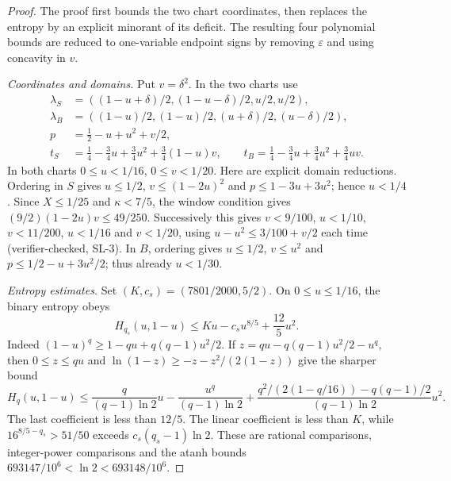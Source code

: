 \begin{proof}
The proof first bounds the two chart coordinates, then replaces the entropy by an explicit
minorant of its deficit. The resulting four polynomial bounds are reduced to one-variable
endpoint signs by removing $\varepsilon$ and using concavity in $v$.

\emph{Coordinates and domains.}
Put $v=\delta^2$. In the two charts use
\[
\begin{aligned}
\lambda_S&=((1-u+\delta)/2,(1-u-\delta)/2,u/2,u/2),\\
\lambda_B&=((1-u)/2,(1-u)/2,(u+\delta)/2,(u-\delta)/2),\\
p&=\tfrac12-u+u^2+v/2,\\
t_S&=\tfrac14-\tfrac34u+\tfrac34u^2+\tfrac34(1-u)v,\qquad
t_B=\tfrac14-\tfrac34u+\tfrac34u^2+\tfrac34uv.
\end{aligned}
\tag{SV}\label{eq:fqe-sliver-coordinates}
\]
In both charts $0\le u<1/16$, $0\le v<1/20$.
Here are explicit domain reductions. Ordering in $S$ gives $u\le1/2$,
$v\le(1-2u)^2$ and $p\le1-3u+3u^2$; hence $u<1/4$.
Since $X\le1/25$ and $\kappa<7/5$, the window condition gives
$(9/2)(1-2u)v\le49/250$.
Successively this gives $v<9/100$, $u<1/10$, $v<11/200$,
$u<1/16$ and $v<1/20$, using $u-u^2\le3/100+v/2$ each time
(verifier-checked, SL-3).
In $B$, ordering gives $u\le1/2$, $v\le u^2$ and
$p\le1/2-u+3u^2/2$; thus already $u<1/30$.

\emph{Entropy estimates.}
Set $(K,c_s)=(7801/2000,5/2)$.
On $0\le u\le1/16$, the binary entropy obeys
\[
H_{q_s}(u,1-u)\le Ku-c_su^{8/5}+\frac{12}5u^2.
\tag{SE}\label{eq:fqe-sliver-binary}
\]
Indeed $(1-u)^q\ge1-qu+q(q-1)u^2/2$. If
$z=qu-q(q-1)u^2/2-u^q$, then $0\le z\le qu$ and
$\ln(1-z)\ge-z-z^2/(2(1-z))$ give the sharper bound
\[
H_q(u,1-u)\le\frac q{(q-1)\ln2}u-\frac{u^q}{(q-1)\ln2}
+\frac{q^2/(2(1-q/16))-q(q-1)/2}{(q-1)\ln2}u^2.
\]
The last coefficient is less than $12/5$. The linear coefficient is
less than $K$, while $16^{8/5-q_s}>51/50$ exceeds $c_s(q_s-1)\ln2$.
These are rational comparisons, integer-power comparisons and the
atanh bounds $693147/10^6<\ln2<693148/10^6$.


\end{proof}
